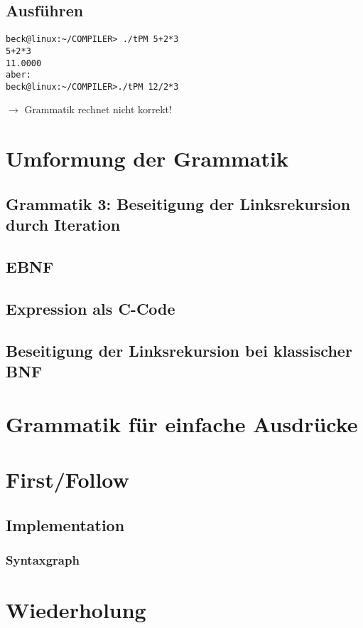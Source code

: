 \subsection{Ausführen}
\begin{lstlisting}
beck@linux:~/COMPILER> ./tPM 5+2*3
5+2*3
11.0000
aber:
beck@linux:~/COMPILER>./tPM 12/2*3
\end{lstlisting}
$\to$ Grammatik rechnet nicht korrekt!

\section{Umformung der Grammatik}

\subsection{Grammatik 3: Beseitigung der Linksrekursion durch Iteration}

\subsection{EBNF}

\subsection{Expression als C-Code}

\subsection{Beseitigung der Linksrekursion bei klassischer BNF}

\section{Grammatik für einfache Ausdrücke}

\section{First/Follow}
\subsection{Implementation}
\subsubsection*{Syntaxgraph}

\section{Wiederholung}






